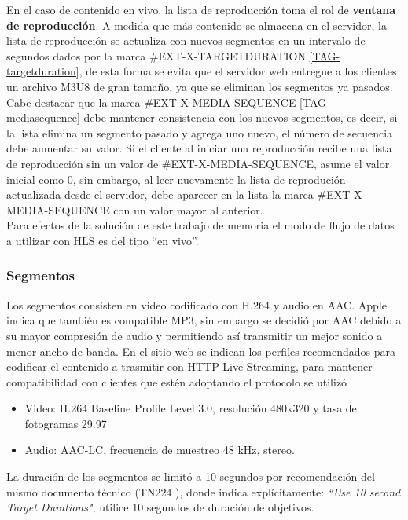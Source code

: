 En el caso de contenido en vivo, la lista de reproducción toma el rol de \textbf{ventana de reproducción}. A medida que más contenido se almacena en el servidor, la lista de reproducción se actualiza con nuevos segmentos en un intervalo de segundos dados por la marca \#EXT-X-TARGETDURATION \ref{TAG-targetduration}, de esta forma se evita que el servidor web entregue a los clientes un archivo M3U8 de gran tamaño, ya que se eliminan los segmentos ya pasados.\\

Cabe destacar que la marca \#EXT-X-MEDIA-SEQUENCE \ref{TAG-mediasequence} debe mantener consistencia con los nuevos segmentos, es decir, si la lista elimina un segmento pasado y agrega uno nuevo, el número de secuencia debe aumentar su valor. Si el cliente al iniciar una reproducción recibe una lista de reproducción sin un valor de \#EXT-X-MEDIA-SEQUENCE, asume el valor inicial como 0, sin embargo, al leer nuevamente la lista de reprodución actualizada desde el servidor, debe aparecer en la lista la marca \#EXT-X-MEDIA-SEQUENCE con un valor mayor al anterior.\\

Para efectos de la solución de este trabajo de memoria el modo de flujo de datos a utilizar con HLS es del tipo ``en vivo''.
\subsubsection{Segmentos}
Los segmentos consisten en video codificado con H.264 y audio en AAC. Apple indica que también es compatible MP3, sin embargo se decidió por AAC debido a su mayor compresión de audio y permitiendo así transmitir un mejor sonido a menor ancho de banda. En el sitio web \cite{apple-hlsencoding} se indican los perfiles recomendados para codificar el contenido a trasmitir con HTTP Live Streaming, para mantener compatibilidad con clientes que estén adoptando el protocolo se utilizó  
\begin{itemize}
\item Video: H.264 Baseline Profile Level 3.0, resolución 480x320 y tasa de fotogramas 29.97

\item Audio: AAC-LC, frecuencia de muestreo 48 kHz, stereo.

\end{itemize}

La duración de los segmentos se limitó a 10 segundos por recomendación del mismo documento técnico (TN224 \cite{apple-hlsencoding}), donde indica explícitamente: \textit{\textquotedblleft Use 10 second Target Durations"}, utilice 10 segundos de duración de objetivos.

